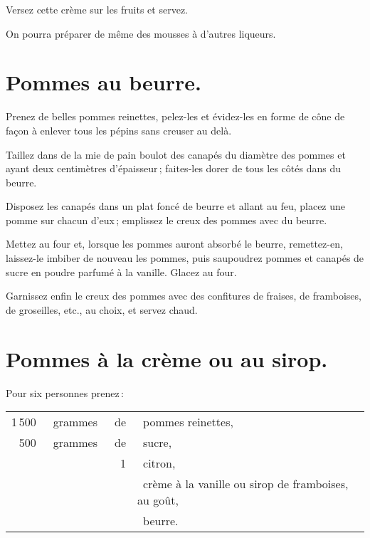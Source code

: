Versez cette crème sur les fruits et servez.

\sk

On pourra préparer de même des mousses à d’autres liqueurs.

\section*{\centering Pommes au beurre.}
{}

Prenez de belles pommes reinettes, pelez-les et évidez-les en forme de cône de
façon à enlever tous les pépins sans creuser au delà.

Taillez dans de la mie de pain boulot des canapés du diamètre des pommes et
ayant deux centimètres d'épaisseur ; faites-les dorer de tous les côtés dans du
beurre.

Disposez les canapés dans un plat foncé de beurre et allant au feu, placez une
pomme sur chacun d'eux ; emplissez le creux des pommes avec du beurre.

Mettez au four et, lorsque les pommes auront absorbé le beurre, remettez-en,
laissez-le imbiber de nouveau les pommes, puis saupoudrez pommes et canapés de
sucre en poudre parfumé à la vanille. Glacez au four.

Garnissez enfin le creux des pommes avec des confitures de fraises, de
framboises, de groseilles, etc., au choix, et servez chaud.

\section*{\centering Pommes à la crème ou au sirop.}
{}

Pour six personnes prenez :

\footnotesize
\begin{longtable}{rrrp{16em}}
  1 500 & grammes & de & pommes reinettes,                                                                \\
    500 & grammes & de & sucre,                                                                           \\
        &         &  1 & citron,                                                                          \\
        &         &    & crème à la vanille ou sirop de framboises, au goût,                              \\
        &         &    & beurre.                                                                          \\
\end{longtable}
\normalsize

